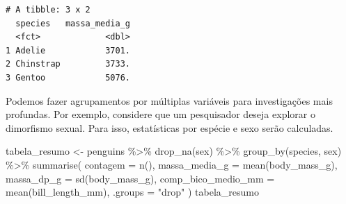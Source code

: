\documentclass[
  12pt,
  letterpaper,
  DIV=11,
  numbers=noendperiod]{scrreprt}
\newenvironment{Shaded}{\begin{snugshade}}{\end{snugshade}}
\newcommand{\AttributeTok}[1]{\textcolor[rgb]{0.40,0.45,0.13}{#1}}
\newcommand{\FunctionTok}[1]{\textcolor[rgb]{0.28,0.35,0.67}{#1}}
\newcommand{\NormalTok}[1]{\textcolor[rgb]{0.00,0.23,0.31}{#1}}
\newcommand{\OtherTok}[1]{\textcolor[rgb]{0.00,0.23,0.31}{#1}}
\newcommand{\SpecialCharTok}[1]{\textcolor[rgb]{0.37,0.37,0.37}{#1}}
\newcommand{\StringTok}[1]{\textcolor[rgb]{0.13,0.47,0.30}{#1}}
\theoremstyle{definition}
\theoremstyle{exemplo}
\begin{document}
\begin{verbatim}
# A tibble: 3 x 2
  species   massa_media_g
  <fct>             <dbl>
1 Adelie            3701.
2 Chinstrap         3733.
3 Gentoo            5076.
\end{verbatim}

\noindent Podemos fazer agrupamentos por múltiplas variáveis para
investigações mais profundas. Por exemplo, considere que um pesquisador
deseja explorar o dimorfismo sexual. Para isso, estatísticas por espécie
e sexo serão calculadas.

\begin{Shaded}
\begin{Highlighting}[]
\NormalTok{tabela\_resumo }\OtherTok{\textless{}{-}}\NormalTok{ penguins }\SpecialCharTok{\%\textgreater{}\%} 
  \FunctionTok{drop\_na}\NormalTok{(sex) }\SpecialCharTok{\%\textgreater{}\%} 
  \FunctionTok{group\_by}\NormalTok{(species, sex) }\SpecialCharTok{\%\textgreater{}\%} 
  \FunctionTok{summarise}\NormalTok{(}
    \AttributeTok{contagem =} \FunctionTok{n}\NormalTok{(),}
    \AttributeTok{massa\_media\_g =} \FunctionTok{mean}\NormalTok{(body\_mass\_g),}
    \AttributeTok{massa\_dp\_g =} \FunctionTok{sd}\NormalTok{(body\_mass\_g),}
    \AttributeTok{comp\_bico\_medio\_mm =} \FunctionTok{mean}\NormalTok{(bill\_length\_mm),}
    \AttributeTok{.groups =} \StringTok{"drop"}
\NormalTok{  )}
\NormalTok{tabela\_resumo}
\end{Highlighting}
\end{Shaded}

\begin{table}[H]

\caption{\label{tbl-tabela-resumo1}Estatísticas descritivas de
características biométricas de pinguins, agrupadas por espécie e sexo.}


\end{table}%
\end{document}
